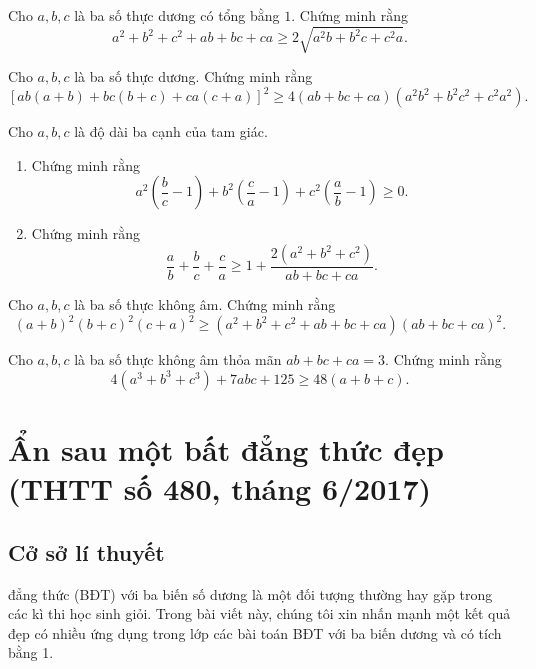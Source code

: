 {\begin{bt}%
	Cho $a,b,c$ là ba số thực dương có tổng bằng $1$. Chứng minh rằng 
	\[a^2+b^2+c^2+ab+bc+ca\geq 2\sqrt{a^2b+b^2c+c^2a}. \]
\end{bt}

\begin{bt}%
	Cho $a,b,c$ là ba số thực dương. Chứng minh rằng 
	\[[ab(a+b)+bc(b+c)+ca(c+a)]^2\geq 4(ab+bc+ca)(a^2b^2+b^2c^2+c^2a^2). \]	
\end{bt}

\begin{bt}%
	Cho $a,b,c$ là độ dài ba cạnh của tam giác. 
	\begin{enumerate}
		\item Chứng minh rằng \[a^2\left(\dfrac{b}{c}-1\right)+b^2\left(\dfrac{c}{a}-1\right) +c^2\left(\dfrac{a}{b}-1\right)\geq 0. \]
		\item Chứng minh rằng \[\dfrac{a}{b}+\dfrac{b}{c}+\dfrac{c}{a}\geq 1+\dfrac{2(a^2+b^2+c^2)}{ab+bc+ca}. \]
	\end{enumerate} 
\end{bt}

\begin{bt}%
	Cho $a,b,c$ là ba số thực không âm. Chứng minh rằng 
	\[(a+b)^2(b+c)^2(c+a)^2\geq (a^2+b^2+c^2+ab+bc+ca)(ab+bc+ca)^2. \]
\end{bt}

\begin{bt}%
	Cho $a,b,c$ là ba số thực không âm thỏa mãn $ab+bc+ca=3$. Chứng minh rằng 
	\[4(a^3+b^3+c^3)+7abc+125\geq 48(a+b+c). \]
\end{bt}

\section{Ẩn sau một bất đẳng thức đẹp (THTT số 480, tháng
	6/2017)}
\begin{center}
	\textbf{\color{violet}{Cao Minh Quang\\
			(GV THPT Chuyên Nguyễn Bỉnh Khiêm, Vĩnh Long)}}
\end{center}
\subsection{Cở sở lí thuyết}
 đẳng thức (BĐT) với ba biến số dương là một đối tượng thường hay gặp trong các kì thi học sinh giỏi. Trong bài viết này, chúng tôi xin nhấn mạnh một kết quả đẹp có nhiều ứng dụng trong lớp các bài toán BĐT với ba biến dương và có tích bằng 1.
}
